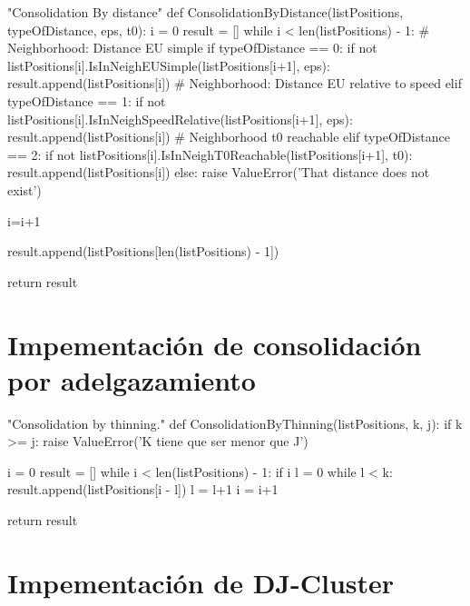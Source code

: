 \documentclass[a4paper, 12pt]{article}
\begin{document}
\begin{python}
"Consolidation By distance"
def ConsolidationByDistance(listPositions, typeOfDistance, eps, t0):
	i = 0
	result = []
	while i < len(listPositions) - 1:
		# Neighborhood: Distance EU simple
		if typeOfDistance == 0:
			if not listPositions[i].IsInNeighEUSimple(listPositions[i+1], eps):
				result.append(listPositions[i])
		# Neighborhood: Distance EU relative to speed
		elif typeOfDistance == 1:
			if not listPositions[i].IsInNeighSpeedRelative(listPositions[i+1], eps):
				result.append(listPositions[i])
		# Neighborhood t0 reachable
		elif typeOfDistance == 2:
			if not listPositions[i].IsInNeighT0Reachable(listPositions[i+1], t0):
				result.append(listPositions[i])
		else:
			raise ValueError('That distance does not exist')

		i=i+1

	result.append(listPositions[len(listPositions) - 1])

	return result

\end{python}

\newpage
\section{Impementaci\'on de consolidaci\'on por adelgazamiento} \label{App:AppendixB}

\begin{python}
"Consolidation by thinning."
def ConsolidationByThinning(listPositions, k, j):
	if k >= j:
		raise ValueError('K tiene que ser menor que J')
        
	i = 0
	result = []
	while i < len(listPositions) - 1:
		if i%
			l = 0
			while l < k:
				result.append(listPositions[i - l])
				l = l+1
			i = i+1

	return result
\end{python}


\newpage
\section{Impementaci\'on de DJ-Cluster} \label{App:AppendixC}
\end{document}
